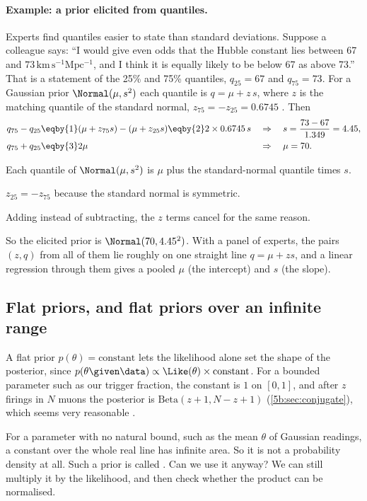 \paragraph{Example: a prior elicited from quantiles.}
Experts find quantiles easier to state than standard deviations. Suppose a colleague
says: ``I would give even odds that the Hubble constant lies between 67 and
$73\,\mathrm{km\,s^{-1}Mpc^{-1}}$, and I think it is equally likely to be below 67 as
above 73.'' That is a statement of the 25\% and 75\% quantiles, $q_{25}=67$ and
$q_{75}=73$. For a Gaussian prior $\Normal(\mu,s^2)$ each quantile is $q=\mu+z\,s$, where
$z$ is the matching quantile of the standard normal, $z_{75}=-z_{25}=0.6745$
. Then
\begin{align*}
  q_{75}-q_{25}&\eqby{1}(\mu+z_{75}s)-(\mu+z_{25}s)\eqby{2}2\times0.6745\,s
  &&\Rightarrow\quad s=\frac{73-67}{1.349}=4.45,\\
  q_{75}+q_{25}&\eqby{3}2\mu
  &&\Rightarrow\quad \mu=70 .
\end{align*}
\begin{explain}
  \item Each quantile of $\Normal(\mu,s^2)$ is $\mu$ plus the standard-normal quantile
        times $s$.
  \item $z_{25}=-z_{75}$ because the standard normal is symmetric.
  \item Adding instead of subtracting, the $z$ terms cancel for the same reason.
\end{explain}
So the elicited prior is $\Normal(70,4.45^2)$. With a panel of experts, the pairs
$(z,q)$ from all of them lie roughly on one straight line $q=\mu+zs$, and a linear
regression through them gives a pooled $\mu$ (the intercept) and $s$ (the slope).

\subsection{Flat priors, and flat priors over an infinite range}

A flat prior $p(\theta)=\text{constant}$ lets the likelihood alone set the shape of the
posterior, since $p(\theta\given\data)\propto\Like(\theta)\times\text{constant}$. For a
bounded parameter such as our trigger fraction, the constant is $1$ on $[0,1]$, and after
$z$ firings in $N$ muons the posterior is $\mathrm{Beta}(z+1,N-z+1)$ (\cref{5b:sec:conjugate}),
which seems very reasonable .

For a parameter with no natural bound, such as the mean $\theta$ of Gaussian readings,
a constant over the whole real line has infinite area. So it is not a probability
density at all. Such a prior is called . Can we use it anyway? We can
still multiply it by the likelihood, and then check whether the product can be
normalised.

